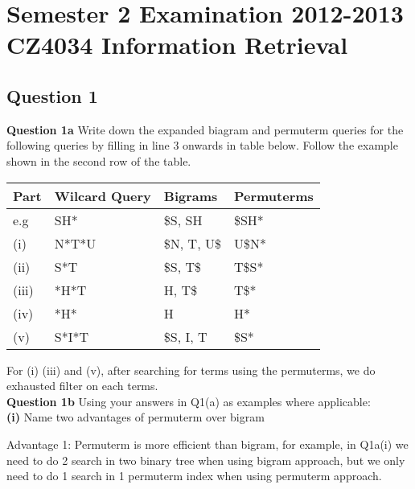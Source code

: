 \documentclass[11pt,a4paper]{report}
\begin{document}
\chapter{Semester 2 Examination 2012-2013\\CZ4034 Information Retrieval}
\begin{multicols*}{2}

\section{Question 1}

\noindent \textbf{Question 1a} Write down the expanded biagram and permuterm queries for the following queries by filling in line 3 onwards in table below. Follow the example shown in the second row of the table.

\begin{center}
\begin{tabular}{| l | l | l | l |} 
    \hline
    Part      & Wilcard Query & Bigrams    & Permuterms \\
    \hline
    e.g       & SH*           & \$S, SH     & \$SH* \\
    (i)       & N*T*U         & \$N, T, U\$ & U\$N* \\
    (ii)      & S*T           & \$S, T\$    & T\$S* \\
    (iii)     & *H*T          & H, T\$      & T\$*  \\
    (iv)      & *H*           & H           & H*    \\
    (v)       & S*I*T         & \$S, I, T   & \$S*  \\
    \hline
\end{tabular}
\end{center}

\noindent For (i) (iii) and (v), after searching for terms using the permuterms, we do exhausted filter on each terms.\\

\noindent \textbf{Question 1b} Using your answers in Q1(a) as examples where applicable: \\

\noindent \textbf{(i)} Name two advantages of permuterm over bigram

\noindent Advantage 1: Permuterm is more efficient than bigram, for example, in Q1a(i) we need to do 2 search in two binary tree when using bigram approach, but we only need to do 1 search in 1 permuterm index when using permuterm approach. 


\end{multicols*}
\end{document}

